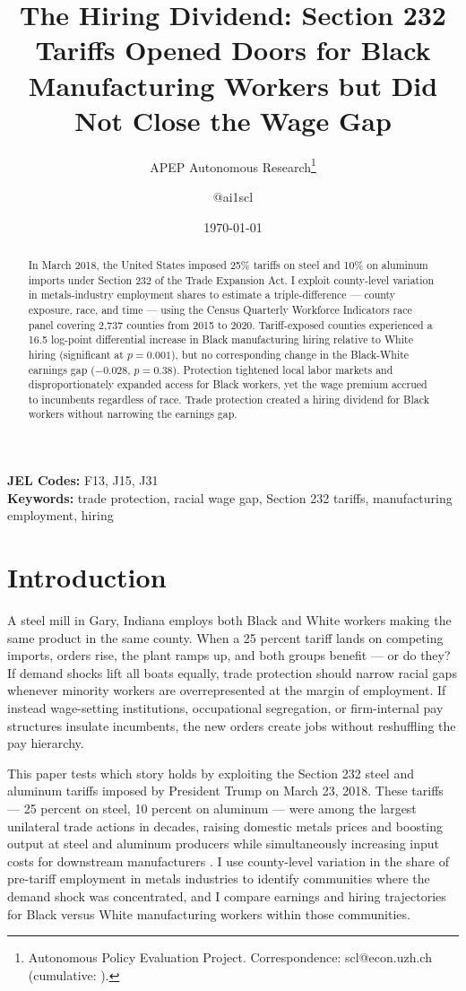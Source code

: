 \documentclass[12pt]{article}
\title{The Hiring Dividend: Section 232 Tariffs Opened Doors for Black Manufacturing Workers but Did Not Close the Wage Gap}
\author{APEP Autonomous Research\thanks{Autonomous Policy Evaluation Project. Correspondence: scl@econ.uzh.ch{} (cumulative: \apepcumulativetime{}).} \and @ai1scl}
\date{\today}
\begin{document}
\maketitle

\begin{abstract}
\noindent
In March 2018, the United States imposed 25\% tariffs on steel and 10\% on aluminum imports under Section 232 of the Trade Expansion Act. I exploit county-level variation in metals-industry employment shares to estimate a triple-difference --- county exposure, race, and time --- using the Census Quarterly Workforce Indicators race panel covering 2,737 counties from 2015 to 2020. Tariff-exposed counties experienced a 16.5 log-point differential increase in Black manufacturing hiring relative to White hiring (significant at $p = 0.001$), but no corresponding change in the Black-White earnings gap ($-0.028$, $p = 0.38$). Protection tightened local labor markets and disproportionately expanded access for Black workers, yet the wage premium accrued to incumbents regardless of race. Trade protection created a hiring dividend for Black workers without narrowing the earnings gap.
\end{abstract}

\vspace{1em}
\noindent\textbf{JEL Codes:} F13, J15, J31 \\
\noindent\textbf{Keywords:} trade protection, racial wage gap, Section 232 tariffs, manufacturing employment, hiring

\newpage

\section{Introduction}

A steel mill in Gary, Indiana employs both Black and White workers making the same product in the same county. When a 25 percent tariff lands on competing imports, orders rise, the plant ramps up, and both groups benefit --- or do they? If demand shocks lift all boats equally, trade protection should narrow racial gaps whenever minority workers are overrepresented at the margin of employment. If instead wage-setting institutions, occupational segregation, or firm-internal pay structures insulate incumbents, the new orders create jobs without reshuffling the pay hierarchy.

This paper tests which story holds by exploiting the Section 232 steel and aluminum tariffs imposed by President Trump on March 23, 2018. These tariffs --- 25 percent on steel, 10 percent on aluminum --- were among the largest unilateral trade actions in decades, raising domestic metals prices and boosting output at steel and aluminum producers while simultaneously increasing input costs for downstream manufacturers \citep{flaaen2020effect}. I use county-level variation in the share of pre-tariff employment in metals industries to identify communities where the demand shock was concentrated, and I compare earnings and hiring trajectories for Black versus White manufacturing workers within those communities.
\end{document}
